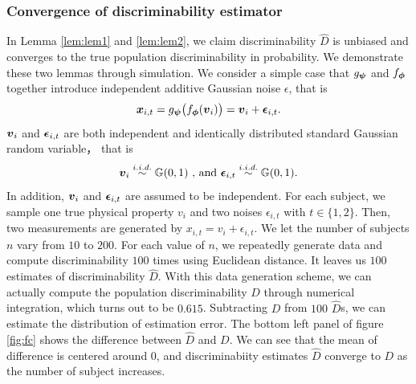 \documentclass{article}
\begin{document}
\subsubsection{Convergence of discriminability estimator}
In Lemma \ref{lem:lem1} and  \ref{lem:lem2}, we claim discriminability $\hat{D}$ is unbiased and converges to  the true population discriminability in probability. We demonstrate these two lemmas through simulation. We consider a simple case that $g_{\boldsymbol{\psi}}$ and $f_{\boldsymbol{\phi}}$ together introduce independent additive Gaussian noise $\epsilon$, that is
\begin{equation}
\boldsymbol{x}_{i,t} =g_{\boldsymbol{\psi}} \big(f_{\boldsymbol{\phi}} (\boldsymbol{v}_i) \big) =\boldsymbol{v}_{i} + \boldsymbol{\epsilon}_{i,t}.
\end{equation}  
$\boldsymbol{v}_{i}$ and $\boldsymbol{\epsilon}_{i,t}$ are both independent and identically distributed standard Gaussian random variable， that is 
\[\boldsymbol{v}_i \overset{i.i.d.}{\sim} \mathbb{G}(0,1) \text{ , and  }\boldsymbol{\epsilon}_{i,t} \overset{i.i.d.}{\sim} \mathbb{G}(0,1).\] 
In addition, $\boldsymbol{v}_{i}$ and $\boldsymbol{\epsilon}_{i,t}$ are assumed to be independent. For each subject, we sample one true physical property $v_i$ and two noises $\epsilon_{i,t}$ with $t\in\{1,2\}$. Then, two measurements are generated by $x_{i,t} = v_{i} + \epsilon_{i,t}$. We let the number of subjects $n$ vary from $10$ to $200$. For each value of $n$, we repeatedly generate data and compute discriminability $100$ times using Euclidean distance. It leaves us $100$ estimates of discriminability $\hat{D}$. With this data generation scheme, we can actually compute the population discriminability $D$ through numerical integration, which turns out to be $0.615$. Subtracting $D$ from $100$ $\hat{D}$s, we can estimate the distribution of estimation error. The bottom left panel of figure \ref{fig:fc} shows the difference between $\hat{D}$ and $D$. We can see that the mean of difference is centered around $0$, and  discriminabiity estimates $\hat{D}$ converge to $D$ as the number of subject increases.
\end{document}
